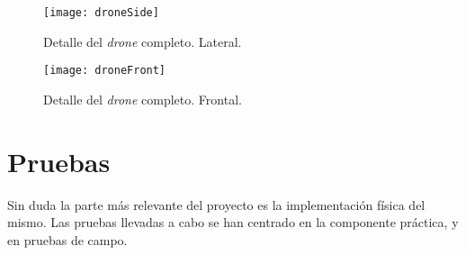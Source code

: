 \begin{figure}
	\centering
	\texttt{[image: droneSide]}
	\caption[Lateral del \emph{drone}]{Detalle del \emph{drone} completo. Lateral.}\label{fig:droneSideView}
\end{figure}

\begin{figure}
	\centering
	\texttt{[image: droneFront]}
	\caption[Frontal del \emph{drone}]{Detalle del \emph{drone} completo. Frontal.}\label{fig:droneFrontView}
\end{figure}


\section{Pruebas}
\label{sec:testing}
Sin duda la parte más relevante del proyecto es la implementación física del mismo. Las pruebas llevadas a cabo se han centrado en la componente práctica, y en pruebas de campo. 

